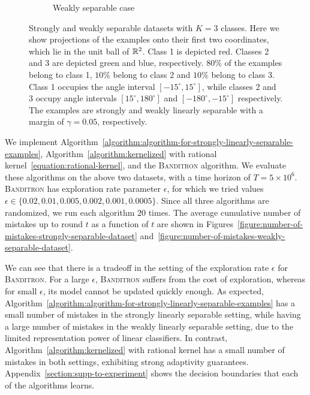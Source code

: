 \begin{figure}[h]
\begin{subfigure}[b]{0.23\textwidth}
\caption{Weakly separable case}
\label{figure:weakly-separable-dataset}
\end{subfigure}
\vspace*{-0.2cm}
\caption{Strongly and weakly separable datasets with $K=3$ classes. Here
 we show projections of the examples onto their first two coordinates, which
 lie in the unit ball of $\mathbb{R}^2$. Class 1 is depicted red. Classes 2 and
3 are depicted green and blue, respectively. $80\%$ of the examples belong to class 1,
$10\%$ belong to class 2 and $10\%$ belong to class 3. Class 1
occupies the angle interval $[-15^\circ, 15^\circ]$, while classes 2 and 3
occupy angle intervals $[15^\circ, 180^\circ]$ and $[-180^\circ, -15^\circ]$
respectively. The examples are strongly and weakly linearly separable with a margin of $\gamma=0.05$, respectively.}
\label{figure:strongly-and-weakly-separable-datasets}
\end{figure}


We implement
Algorithm~\ref{algorithm:algorithm-for-strongly-linearly-separable-examples},
Algorithm~\ref{algorithm:kernelized} with
rational kernel~\eqref{equation:rational-kernel}, and the \textsc{Banditron} algorithm.
We evaluate these algorithms on the above two datasets, with a time horizon of
$T=5\times 10^6$.
\textsc{Banditron}
has exploration rate parameter $\epsilon$, for which we tried values $\epsilon
\in \{0.02, 0.01, 0.005, 0.002, 0.001, 0.0005 \}$.
Since all three
algorithms are randomized, we run each algorithm $20$ times.
The average cumulative number
of mistakes up to round $t$ as a function of $t$ are shown in
Figures~\ref{figure:number-of-mistakes-strongly-separable-dataset}
and~\ref{figure:number-of-mistakes-weakly-separable-dataset}.

We can see that there is a tradeoff in the setting of the exploration rate $\epsilon$
for \textsc{Banditron}. For a large $\epsilon$, \textsc{Banditron} suffers from the cost of exploration, whereas for small $\epsilon$, its model cannot be updated quickly enough.
As expected, Algorithm~\ref{algorithm:algorithm-for-strongly-linearly-separable-examples} has a small number of mistakes in the strongly linearly separable setting, while having a large number
of mistakes in the weakly linearly separable setting, due to the limited representation power of linear classifiers.
In contrast,
Algorithm~\ref{algorithm:kernelized} with rational kernel has a small number of mistakes in both settings, exhibiting strong adaptivity guarantees. Appendix~\ref{section:supp-to-experiment} shows the decision boundaries
that each of the algorithms learns.

